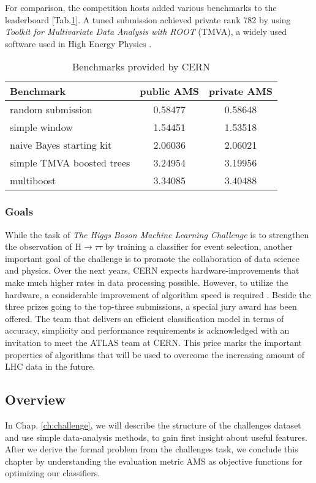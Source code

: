 For comparison, the competition hosts added various benchmarks to the leaderboard [Tab.\ref{tab:benchmarks}]. A tuned submission  achieved private rank 782 by using \emph{Toolkit for Multivariate Data Analysis with ROOT} (TMVA), a widely used software used in High Energy Physics \cite{cowa14}.

\begin{table}
	\begin{center}
		\begin{tabular}{ | l | c | c | }
		    \hline
		    Benchmark & public AMS & private AMS \\
		    \hline
	    	random submission & 0.58477 & 0.58648 \\
		    \hline
		    simple window & 1.54451 & 1.53518\\
		    \hline
		    naive Bayes starting kit & 2.06036 & 2.06021 \\
		    \hline
		    simple TMVA boosted trees & 3.24954 &  3.19956 \\
		    \hline
		    multiboost & 3.34085 &  3.40488 \\
		    \hline
		\end{tabular}
		\caption{Benchmarks provided by CERN}
		\label{tab:benchmarks}
	\end{center}
\end{table}

\subsubsection{Goals}
While the task of \emph{The Higgs Boson Machine Learning Challenge} is to strengthen the observation of $\mathrm{H}\rightarrow\tau\tau $ by training a classifier for event selection, another important goal of the challenge is to promote the collaboration of data science and physics. Over the next years, CERN expects hardware-improvements that make much higher rates in data processing possible. However, to utilize the hardware, a considerable improvement of algorithm speed is required \cite{glig14}.
Beside the three prizes going to the top-three submissions, a special jury award has been offered. The team that delivers an efficient classification model in terms of accuracy, simplicity and performance requirements is acknowledged with an invitation to meet the ATLAS team at CERN.
This price marks the important properties of algorithms that will be used to overcome the increasing amount of LHC data in the future.

\subsection{Overview}
In Chap. \ref{ch:challenge}, we will describe the structure of the challenges dataset \cite{higgsData} and use simple data-analysis methods, to gain first insight about useful features.
After we derive the formal problem from the challenges task, we conclude this chapter by understanding the evaluation metric AMS as objective functions for optimizing our classifiers. 

